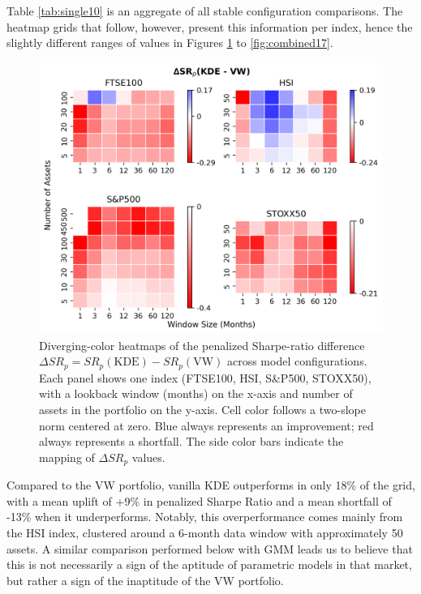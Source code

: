Table \ref{tab:single10} is an aggregate of all stable configuration comparisons. The heatmap grids that follow, however, present this information per index, hence the slightly different ranges of values in Figures \ref{fig:combined13} to \ref{fig:combined17}.

\begin{figure}[H]
  \begin{center}
  \begin{minipage}{1\textwidth}
    \centering
    \includegraphics[width=\textwidth]{images/40_14.png}
  \end{minipage}
  \caption[Heatmap 1]{Diverging-color heatmaps of the penalized Sharpe-ratio difference $\Delta SR_p = SR_p(\mathrm{KDE}) - SR_p(\mathrm{VW})$ across model configurations. Each panel shows one index (FTSE100, HSI, S\&P500, STOXX50), with a lookback window (months) on the x-axis and number of assets in the portfolio on the y-axis. Cell color follows a two-slope norm centered at zero. Blue always represents an improvement; red always represents a shortfall. The side color bars indicate the mapping of $\Delta SR_p$ values.}
  \label{fig:combined13}
  \end{center}
  \end{figure}

Compared to the VW portfolio, vanilla KDE outperforms in only 18\% of the grid, with a mean uplift of +9\% in penalized Sharpe Ratio and a mean shortfall of -13\% when it underperforms. Notably, this overperformance comes mainly from the HSI index, clustered around a 6-month data window with approximately 50 assets. A similar comparison performed below with GMM leads us to believe that this is not necessarily a sign of the aptitude of parametric models in that market, but rather a sign of the inaptitude of the VW portfolio.

